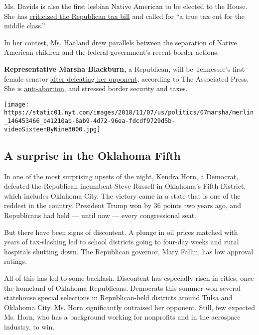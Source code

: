 Ms. Davids is also the first lesbian Native American to be elected to
the House. She has
\href{https://www.shariceforcongress.com/priorities}{criticized the
Republican tax bill} and called for ``a true tax cut for the middle
class.''

In her contest,
\href{https://www.nytimes.com/2018/06/06/us/deb-haaland-new-mexico-congress.html}{Ms.
Haaland drew parallels} between the separation of Native American
children and the federal government's recent border actions.

\textbf{Representative Marsha Blackburn,} a Republican, will be
Tennessee's first female senator
\href{https://www.nytimes.com/elections/results/tennessee-senate}{after
defeating her opponent}, according to The Associated Press. She is
\href{https://www.nytimes.com/2018/09/09/us/politics/blackburn-abortion-tennessee-senate.html}{anti-abortion},
and stressed border security and taxes.

\texttt{[image: https://static01.nyt.com/images/2018/11/07/us/politics/07marsha/merlin\_146453466\_b41210ab-6ab9-4d72-96ea-fdcdf9729d5b-videoSixteenByNine3000.jpg]}

\hypertarget{a-surprise-in-the-oklahoma-fifth}{%
\subsection{A surprise in the Oklahoma
Fifth}\label{a-surprise-in-the-oklahoma-fifth}}

In one of the most surprising upsets of the night, Kendra Horn, a
Democrat, defeated the Republican incumbent Steve Russell in Oklahoma's
Fifth District, which includes Oklahoma City. The victory came in a
state that is one of the reddest in the country. President Trump won by
36 points two years ago, and Republicans had held --- until now ---
every congressional seat.

But there have been signs of discontent. A plunge in oil prices matched
with years of tax-slashing led to school districts going to four-day
weeks and rural hospitals shutting down. The Republican governor, Mary
Fallin, has low approval ratings.

All of this has led to some backlash. Discontent has especially risen in
cities, once the homeland of Oklahoma Republicans. Democrats this summer
won several statehouse special selections in Republican-held districts
around Tulsa and Oklahoma City. Ms. Horn significantly outraised her
opponent. Still, few expected Ms. Horn, who has a background working for
nonprofits and in the aerospace industry, to win.

